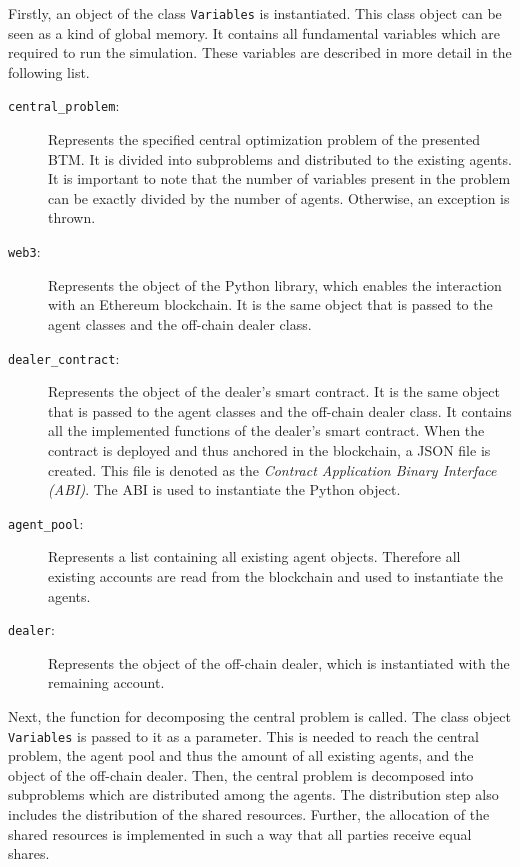 Firstly, an object of the class \verb|Variables| is instantiated. 
This class object can be seen as a kind of global memory.
It contains all fundamental variables which are required to run the simulation.
These variables are described in more detail in the following list.

\begin{description}
	\item[\texttt{central\_problem}:] Represents the specified central optimization problem of the presented BTM.
    It is divided into subproblems and distributed to the existing agents. It is important 
    to note that the number of variables present in the problem can be exactly divided by the number of agents.
    Otherwise, an exception is thrown.
	\item[\texttt{web3}:] Represents the object of the Python library, which enables the interaction with an
	Ethereum blockchain. It is the same object that is passed to the agent classes and the off-chain dealer class.
    \item[\texttt{dealer\_contract}:] Represents the object of the dealer's smart contract. 
    It is the same object that is passed to the agent classes and the off-chain dealer class. It contains all the
    implemented functions of the dealer's smart contract. When the contract is deployed and thus anchored in the blockchain, a JSON file is created. 
    This file is denoted as the \textit{Contract Application Binary Interface (ABI)}. The ABI is used to instantiate the Python object.  
    \item[\texttt{agent\_pool}:] Represents a list containing all existing agent objects. 
    Therefore all existing accounts are read from the blockchain and used to instantiate the agents.
    \item[\texttt{dealer}:] Represents the object of the off-chain dealer, which is instantiated with the 
    remaining account.
\end{description}

Next, the function for decomposing the central problem is called. The class object \verb|Variables| is passed to it as a parameter.
This is needed to reach the central problem, the agent pool and thus the amount of all existing agents, and the object of the
off-chain dealer. 
Then, the central problem is decomposed into subproblems which are distributed among the agents. 
The distribution step also includes the distribution of the shared resources. 
Further, the allocation of the shared resources is implemented in such a way that all parties receive equal shares.


